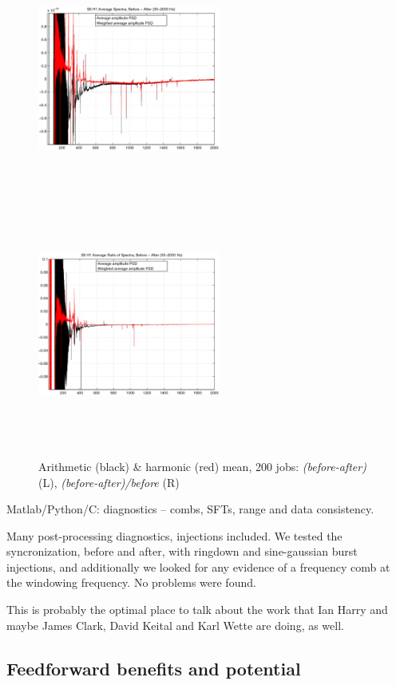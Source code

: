 \begin{figure}
\includegraphics[height=80mm, width=60mm]{clip-diff.eps}
\includegraphics[height=80mm, width=60mm]{clip-diff-ratio.eps}
\caption{Arithmetic (black) \& harmonic (red) mean,
200 jobs: \textit{(before-after)} (L), \textit{(before-after)/before} (R)}
\end{figure}

            Matlab/Python/C: diagnostics -- combs, SFTs, range and data consistency.

            Many post-processing diagnostics, injections included. We tested the syncronization, before and after, with ringdown and sine-gaussian burst injections, and additionally we looked for any evidence of a frequency comb at the windowing frequency. No problems were found.

	    This is probably the optimal place to talk about the work that Ian Harry and maybe James Clark, David Keital and Karl Wette are doing, as well.

        \subsection{Feedforward benefits and potential}
        \label{benefits}

